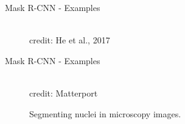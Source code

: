 \begin{frame} {Mask R-CNN - Examples}
   \begin{figure}
    \centering
      \tiny{\\credit: He et al., 2017}
  \end{figure}
\end{frame}

\begin{frame} {Mask R-CNN - Examples}
   \begin{figure}
    \centering
      \tiny{\\credit: Matterport}
      \caption{\footnotesize{Segmenting nuclei in microscopy images.}}
  \end{figure}
\end{frame}


